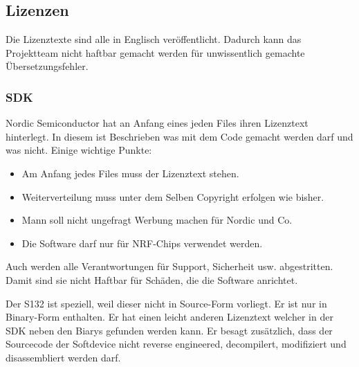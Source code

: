 \subsection{Lizenzen}\label{sec:lizenzen}
Die Lizenztexte sind alle in Englisch veröffentlicht. Dadurch kann das Projektteam nicht haftbar gemacht werden für unwissentlich gemachte Übersetzungsfehler.

\subsubsection*{SDK}
Nordic Semiconductor hat an Anfang eines jeden Files ihren Lizenztext \cite{nordic_sdk_license} hinterlegt. In diesem ist Beschrieben was mit dem Code gemacht werden darf und was nicht. Einige wichtige Punkte:

\begin{itemize}
	\item Am Anfang jedes Files muss der Lizenztext stehen.
	\item Weiterverteilung muss unter dem Selben Copyright erfolgen wie bisher.
	\item Mann soll nicht ungefragt Werbung machen für Nordic und Co.
	\item Die Software darf nur für NRF-Chips verwendet werden.
\end{itemize}

Auch werden alle Verantwortungen für Support, Sicherheit usw. abgestritten. Damit sind sie nicht Haftbar für Schäden, die die Software anrichtet.

Der S132 ist speziell, weil dieser nicht in Source-Form vorliegt. Er ist nur in Binary-Form enthalten. Er hat einen leicht anderen Lizenztext welcher in der SDK neben den Biarys gefunden werden kann. Er besagt zusätzlich, dass der Sourcecode der Softdevice nicht reverse engineered, decompilert, modifiziert und disassembliert werden darf.






